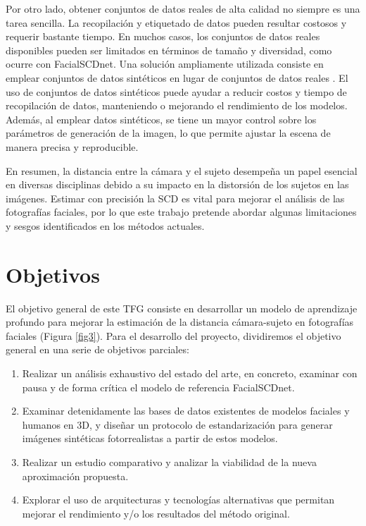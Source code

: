 Por otro lado, obtener conjuntos de datos reales de alta calidad no siempre es una tarea sencilla. La recopilación y etiquetado de datos pueden resultar costosos y requerir bastante tiempo. En muchos casos, los conjuntos de datos reales disponibles pueden ser limitados en términos de tamaño y diversidad, como ocurre con FacialSCDnet.
Una solución ampliamente utilizada consiste en emplear conjuntos de datos sintéticos en lugar de conjuntos de datos reales \cite{57,58,59}.
El uso de conjuntos de datos sintéticos puede ayudar a reducir costos y tiempo de recopilación de datos, manteniendo o mejorando el rendimiento de los modelos. Además, al emplear datos sintéticos, se tiene un mayor control sobre los parámetros de generación de la imagen, lo que permite ajustar la escena de manera precisa y reproducible.

En resumen, la distancia entre la cámara y el sujeto desempeña un papel esencial en diversas disciplinas debido a su impacto en la distorsión de los
sujetos en las imágenes. Estimar con precisión la SCD es vital para mejorar el análisis de las fotografías faciales, por lo que este trabajo pretende abordar algunas limitaciones y sesgos identificados en los métodos actuales.

\section{Objetivos}
 El objetivo general de este TFG consiste en desarrollar un modelo de aprendizaje profundo para mejorar la estimación de la distancia cámara-sujeto en fotografías faciales (Figura \ref{fig3}). Para el desarrollo del proyecto, dividiremos el objetivo general en una serie de objetivos parciales:
\begin{enumerate}
    \item Realizar un análisis exhaustivo del estado del arte, en concreto, examinar con pausa y de forma crítica el modelo de referencia FacialSCDnet.
    \item Examinar detenidamente las bases de datos existentes de modelos faciales y humanos en 3D, y diseñar un protocolo de estandarización para generar imágenes sintéticas fotorrealistas a partir de estos modelos.
    \item Realizar un estudio comparativo y analizar la viabilidad de la nueva aproximación propuesta.
    \item Explorar el uso de arquitecturas y tecnologías alternativas que permitan mejorar el rendimiento y/o los resultados del método original.
\end{enumerate}


